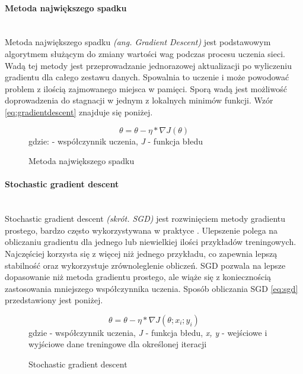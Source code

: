 \paragraph{Metoda największego spadku} \mbox{}\\
Metoda największego spadku \textit{(ang. Gradient Descent)} jest podstawowym algorytmem
służącym do zmiany wartości wag podczas procesu uczenia sieci.
Wadą tej metody jest przeprowadzanie jednorazowej aktualizacji po wyliczeniu gradientu dla
całego zestawu danych. Spowalnia to uczenie i może powodować problem z ilością zajmowanego
miejsca w pamięci. Sporą wadą jest możliwość doprowadzenia do stagnacji w jednym z
lokalnych minimów funkcji. Wzór \ref{eq:gradientdescent} znajduje się poniżej.
\begin{figure}[h!]
\renewcommand{\figurename}{Wzór}%
\begin{equation} \label{eq:gradientdescent}
\theta = \theta - \eta * \nabla J(\theta)
\end{equation}
\centering
gdzie: \texteta - współczynnik uczenia, \textit{J} - funkcja błedu
\caption{Metoda największego spadku}
\end{figure}

\paragraph{Stochastic gradient descent} \mbox{}\\
Stochastic gradient descent \textit{(skrót. SGD)} jest rozwinięciem metody gradientu
prostego, bardzo często wykorzystywana w praktyce \cite{OptimizersOverview}.
Ulepszenie polega na obliczaniu gradientu dla jednego lub niewielkiej ilości przykładów
treningowych. Najczęściej korzysta się z więcej niż jednego przykładu, co zapewnia
lepszą stabilność oraz wykorzystuje zrównoleglenie obliczeń. SGD pozwala na lepsze dopasowanie
niż metoda gradientu prostego, ale wiąże się z koniecznością zastosowania mniejszego
współczynnika uczenia. Sposób obliczania SGD \ref{eq:sgd} przedstawiony jest poniżej.
\begin{figure}[h!]
\renewcommand{\figurename}{Wzór}%
\begin{equation} \label{eq:sgd}
\theta = \theta - \eta * \nabla J(\theta; x_i; y_i)
\end{equation}
\centering
gdzie \texteta - współczynnik uczenia, \textit{J} - funkcja błedu,
\textit{x, y} - wejściowe i wyjściowe dane treningowe dla określonej iteracji
\caption{Stochastic gradient descent}
\end{figure}

